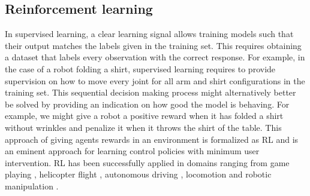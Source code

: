 \documentclass[\home/main.tex]{subfiles}
\begin{document}
\subsection{Reinforcement learning} \label{subsec:lit_rl}



In supervised learning, a clear learning signal allows training models such that their output matches the labels given in the training set. This requires obtaining a dataset that labels every observation with the correct response. For example, in the case of a robot folding a shirt, supervised learning requires to provide supervision on how to move every joint for all arm and shirt configurations in the training set. This sequential decision making process might alternatively better be solved by providing an indication on how good the model is behaving. For example, we might give a robot a positive reward when it has folded a shirt without wrinkles and penalize it when it throws the shirt of the table. This approach of giving agents rewards in an environment is formalized as \gls{RL} and is an eminent approach for learning control policies with minimum user intervention. RL has been successfully applied in domains ranging from game playing \autocite{mnih2015human}, helicopter flight \autocite{ng2003autonomous}, autonomous driving \autocite{sallab2017deep}, locomotion \autocite{tan2018sim} and robotic manipulation \autocite{levine2016end}.
\end{document}
